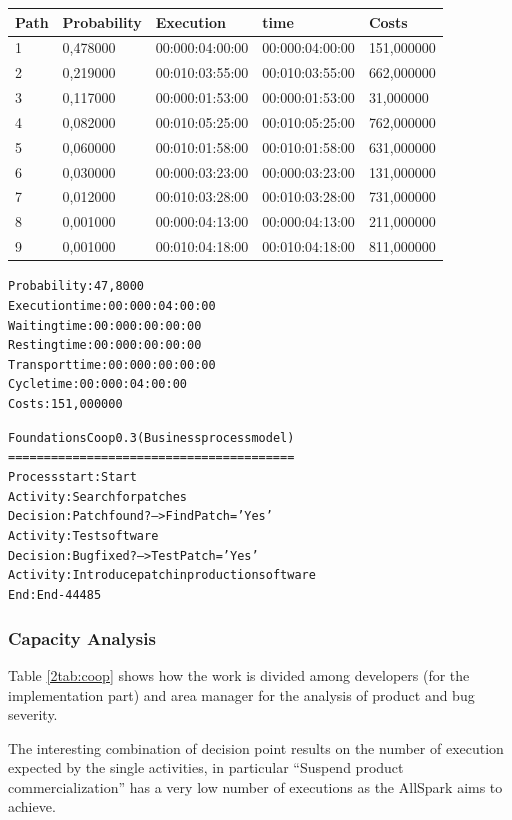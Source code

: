 \begin{table}[ht!]
\centering
\begin{tabular}{|l|l|l|l|l|}
\hline
Path&Probability&Execution&time&Costs\\
\hline
1&0,478000&00:000:04:00:00&00:000:04:00:00&151,000000\\
\hline
2&0,219000&00:010:03:55:00&00:010:03:55:00&662,000000\\
\hline
3&0,117000&00:000:01:53:00&00:000:01:53:00&31,000000\\
\hline
4&0,082000&00:010:05:25:00&00:010:05:25:00&762,000000\\
\hline
5&0,060000&00:010:01:58:00&00:010:01:58:00&631,000000\\
\hline
6&0,030000&00:000:03:23:00&00:000:03:23:00&131,000000\\
\hline
7&0,012000&00:010:03:28:00&00:010:03:28:00&731,000000\\
\hline
8&0,001000&00:000:04:13:00&00:000:04:13:00&211,000000\\
\hline
9&0,001000&00:010:04:18:00&00:010:04:18:00&811,000000\\
\hline
\end{tabular}
\end{table}

\begin{alltt}
Probability:   47,8000%
Execution time:  00:000:04:00:00
Waiting time:  00:000:00:00:00
Resting time:  00:000:00:00:00
Transport time:  00:000:00:00:00
Cycle time:  00:000:04:00:00
Costs:  151,000000

Foundations Coop 0.3 (Business process model)
========================================
Process start: Start
Activity: Search for patches
Decision: Patch found? --> FindPatch = 'Yes'
Activity: Test software
Decision: Bug fixed? --> TestPatch = 'Yes'
Activity: Introduce patch in production software
End: End-44485
\end{alltt}

\subsubsection{Capacity Analysis}
Table \ref{2tab:coop} shows how the work is divided among developers (for
the implementation part) and area manager for the analysis of product and
bug severity. 

The interesting combination of decision point results on the number of execution expected by the single activities, in particular ``Suspend product commercialization'' has a very low number of executions as the AllSpark aims to achieve.

